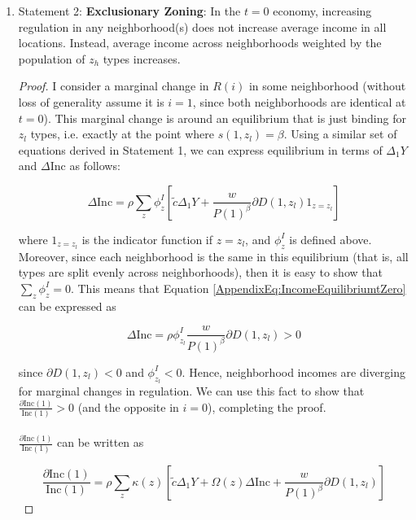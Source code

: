 \documentclass[12pt]{article}
\begin{document}
\begin{enumerate}
		
		\item Statement 2: \textbf{Exclusionary Zoning}: In the $t = 0$ economy, increasing regulation in any neighborhood(s) does not increase average income in all locations. Instead, average income across neighborhoods weighted by the population of $z_{h}$ types increases. 
		
		\begin{proof}
			I consider a marginal change in $R(i)$ in some neighborhood (without loss of generality assume it is $i = 1$, since both neighborhoods are identical at $t = 0$). This marginal change is around an equilibrium that is just binding for $z_{l}$ types, i.e. exactly at the point where $s(1, z_{l}) = \beta$. Using a similar set of equations derived in Statement 1, we can express equilibrium in terms of $\Delta_{1}Y$ and $\Delta \text{Inc}$ as follows:
			
			\begin{equation}\label{AppendixEq:IncomeEquilibriumtZero}
				\Delta \text{Inc} = \rho \sum_{z}\phi^{I}_{z}[\tilde{c} \Delta_{1} Y + \frac{w}{P(1)^{\beta}}\partial D(1, z_{l})1_{z = z_{l}}] 
			\end{equation}
			
			where $1_{z = z_{l}}$ is the indicator function if $z = z_{l}$, and $\phi^{I}_{z}$ is defined above. Moreover, since each neighborhood is the same in this equilibrium (that is, all types are split evenly across neighborhoods), then it is easy to show that $\sum_{z}\phi^{I}_{z} = 0$. This means that Equation \eqref{AppendixEq:IncomeEquilibriumtZero} can be expressed as 
			
			\begin{equation*}
				\Delta \text{Inc} = \rho\phi^{I}_{z_{l}}\frac{w}{P(1)^{\beta}}\partial D(1, z_{l}) > 0
			\end{equation*}
			
			since $\partial D(1, z_{l}) < 0$ and $\phi^{I}_{z_{l}} < 0$. Hence, neighborhood incomes are diverging for marginal changes in regulation. We can use this fact to show that $\frac{\partial \text{Inc}(1)}{\text{Inc}(1)} >0$ (and the opposite in $i= 0$), completing the proof. 
			
			\paragraph*{}
			$\frac{\partial \text{Inc}(1)}{\text{Inc}(1)}$ can be written as 
			
			\begin{equation*}
				\frac{\partial \text{Inc}(1)}{\text{Inc}(1)} = \rho \sum_{z}\kappa(z)[\tilde{c}\Delta_{1}Y + \Omega(z)\Delta \text{Inc} + \frac{w}{P(1)^{\beta}}\partial D(1, z_{l})]
			\end{equation*}
			

\end{proof}
\end{enumerate}
\end{document}
